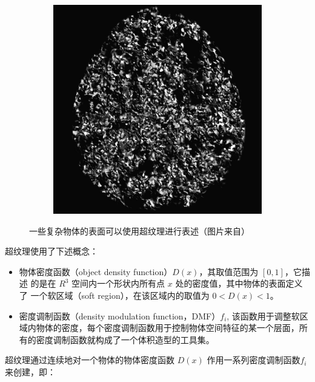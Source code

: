 \begin{figure}
\begin{subfigure}[b]{0.32\textwidth}
	\end{subfigure}
	\begin{subfigure}[b]{0.32\textwidth}
		\includegraphics[width=\textwidth]{figures/df/hypertexture3}
	\end{subfigure}
	\caption{一些复杂物体的表面可以使用超纹理进行表述（图片来自\cite{a:hypetrtexture}）}
	\label{f:df-hypetrtexture}
\end{figure}

超纹理使用了下述概念：

\begin{itemize}
	\item 物体密度函数（object density function）$D(x)$，其取值范围为 $[0,1]$，它描述 的是在 $R^{3}$ 空间内一个形状内所有点 $x$ 处的密度值，其中物体的表面定义了 一个软区域（soft region），在该区域内的取值为 $0 < D(x) < 1$。
	\item 密度调制函数（density modulation function，DMF）$f_i$, 该函数用于调整软区域内物体的密度，每个密度调制函数用于控制物体空间特征的某一个层面，所有的密度调制函数就构成了一个体积造型的工具集。
\end{itemize}

超纹理通过连续地对一个物体的物体密度函数 $D(x)$ 作用一系列密度调制函数$f_i$来创建，即：

